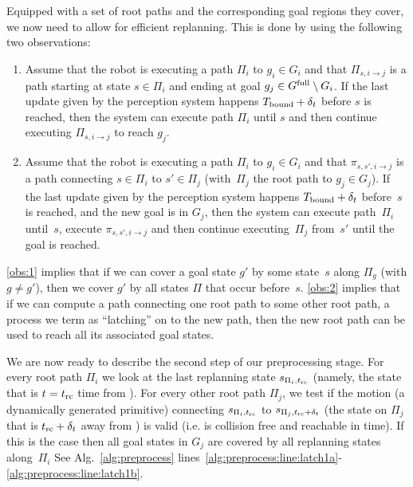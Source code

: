 \documentclass[a4paper]{report}
\begin{document}

Equipped with a set of root paths and the corresponding goal regions they cover, we now need to allow for efficient replanning. This is done by using the following two observations:
\begin{enumerate}[label={\textbf{O\arabic*}},leftmargin=0.75cm]
    \item \label{obs:1} 
    Assume that the robot is executing a path $\Pi_i$ to $g_i \in G_i$ and that $\Pi_{s, i \rightarrow j}$ is a path starting at state $s \in \Pi_i$ and ending at goal $g_j \in G^{\textrm{full}} \setminus G_i$.
    If the last update given by the perception system happens $T_{\textrm{bound}} + \delta_t$ before $s$ is reached,
    then the system can execute path $\Pi_i$ until $s$ and then continue executing $\Pi_{s, i \rightarrow j}$ to reach  $g_j$.

    \item \label{obs:2} 
    Assume that the robot is executing a path $\Pi_i$ to $g_i \in G_i$ and that $\pi_{s,s',i \rightarrow j}$ is a path connecting  $s \in \Pi_i$ to $s' \in \Pi_j$ (with~$\Pi_j$ the root path to $g_j \in G_j$).
    If the last update given by the perception system happens $T_{\textrm{bound}} + \delta_t$ before~$s$ is reached,
    and the new goal is in $G_j$,
    then the system can execute path~$\Pi_i$ until~$s$, execute $\pi_{s,s',i \rightarrow j}$ and then continue executing~$\Pi_{j}$ from~$s'$ until the goal is reached.

\end{enumerate}

%
\ref{obs:1} implies that if we can cover a goal state $g'$  by some state~$s$ along $\Pi_g$ (with $g \neq g'$), then we cover $g'$ by all states $\Pi$ that occur before~$s$.
%
\ref{obs:2} implies that if we can compute a path connecting one root path to some other root path, a process we term as ``latching'' on to the new path, then the new root path can be used to reach all its associated goal states.

We are now ready to describe the second step of our preprocessing stage.
%
For every root path $\Pi_i$ we look at the last replanning state $s_{\Pi_i, t_{\textrm{rc}}}$ (namely, the state that is $t=t_{\textrm{rc}}$ time from \Shome). For every other root path $\Pi_j$, we test if the motion (a dynamically generated primitive) connecting $s_{\Pi_i, t_{\textrm{rc}}}$ to $s_{\Pi_j, t_{\textrm{rc}} + \delta_t}$ (the state on $\Pi_j$ that is $t_{\textrm{rc}}+\delta_t$ away from \Shome) is valid (i.e. is collision free and reachable in time). 
%
If this is the case then all goal states in $G_j$ are covered by all replanning states along~$\Pi_i$
See Alg.~\ref{alg:preprocess} lines~\ref{alg:preprocess:line:latch1a}-\ref{alg:preprocess:line:latch1b}.
%
\end{document}
